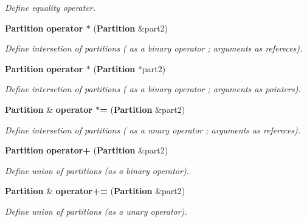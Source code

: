 \begin{CompactItemize}
\begin{CompactList}\small\item\em Define equality operater. \item\end{CompactList}\item 
{\bf Partition} {\bf operator $\ast$} ({\bf Partition} \&part2)\label{classPartition_a69}

\begin{CompactList}\small\item\em Define intersetion of partitions ( as a binary operator ; arguments as refereces). \item\end{CompactList}\item 
{\bf Partition} {\bf operator $\ast$} ({\bf Partition} $\ast$part2)\label{classPartition_a70}

\begin{CompactList}\small\item\em Define intersetion of partitions ( as a binary operator ; arguments as pointers). \item\end{CompactList}\item 
{\bf Partition} \& {\bf operator $\ast$=} ({\bf Partition} \&part2)\label{classPartition_a71}

\begin{CompactList}\small\item\em Define intersetion of partitions ( as a unary operator ; arguments as refereces). \item\end{CompactList}\item 
{\bf Partition} {\bf operator+} ({\bf Partition} \&part2)
\begin{CompactList}\small\item\em Define union of partitions (as a binary operator). \item\end{CompactList}\item 
{\bf Partition} \& {\bf operator+=} ({\bf Partition} \&part2)\label{classPartition_a73}

\begin{CompactList}\small\item\em Define union of partitions (as a unary operator). \item\end{CompactList}\end{CompactItemize}
